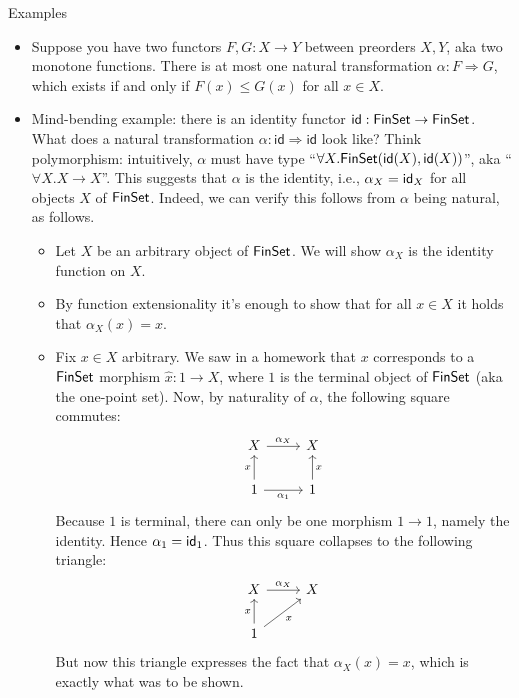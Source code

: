 Examples
\begin{itemize}
\item Suppose you have two functors \(F,G : X \to Y\) between preorders \(X,Y\), aka two monotone functions.
  There is at most one natural transformation \(\alpha : F \Rightarrow G\), which exists if and only if \(F(x) \le G(x)\) for all \(x\in X\).

\item Mind-bending example: there is an identity functor \(\mathsf{id} : \mathsf{FinSet} \to \mathsf{FinSet}\).
  What does a natural transformation \(\alpha : \mathsf{id} \Rightarrow \mathsf{id}\) look like?
  Think polymorphism: intuitively, \(\alpha\) must have type ``\(\forall X. \mathsf{FinSet}(\mathsf{id}(X),\mathsf{id}(X))\)'',
  aka ``\(\forall X. X \to X\)''.
  This suggests that \(\alpha\) is the identity, i.e., \(\alpha_X = \mathsf{id}_X\) for all objects \(X\) of \(\mathsf{FinSet}\).
  Indeed, we can verify this follows from \(\alpha\) being natural, as follows.
  \begin{itemize}
  \item Let \(X\) be an arbitrary object of \(\mathsf{FinSet}\). We will show \(\alpha_X\) is the identity function on \(X\).
  \item By function extensionality it's enough to show that for all \(x \in X\) it holds that \(\alpha_X(x) = x\).
  \item Fix \(x \in X\) arbitrary. We saw in a homework that \(x\) corresponds to a \(\mathsf{FinSet}\) morphism \(\hat x : 1 \to X\),
    where \(1\) is the terminal object of \(\mathsf{FinSet}\) (aka the one-point set).
    Now, by naturality of \(\alpha\), the following square commutes:
    \[%
\begin{tikzcd}
X \arrow[r, "\alpha_X"]                 & X                 \\
1 \arrow[r, "\alpha_1"'] \arrow[u, "x"] & 1 \arrow[u, "x"']
\end{tikzcd}\]
    Because \(1\) is terminal, there can only be one morphism \(1\to 1\), namely the identity. Hence \(\alpha_1 = \mathsf{id}_1\).
    Thus this square collapses to the following triangle:
    \[%
\begin{tikzcd}
X \arrow[r, "\alpha_X"]           & X \\
1 \arrow[u, "x"] \arrow[ru, "x"'] &
\end{tikzcd}\]
But now this triangle expresses the fact that \(\alpha_X(x) = x\), which is exactly what was to be shown.
  \end{itemize}
\end{itemize}

